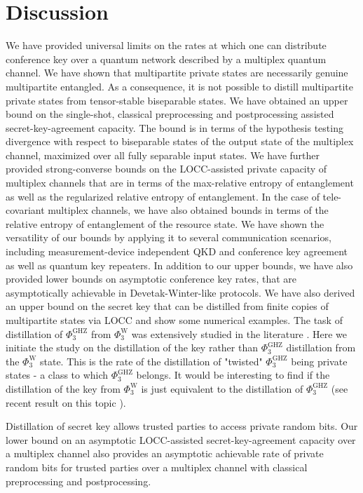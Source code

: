 \documentclass[aps,pra,twocolumn,superscriptaddress,longbibliography]{revtex4-1}
\begin{document}
\section{Discussion}
\label{sec:dis}
We have provided universal limits on the rates at which one can distribute conference key over a quantum network described by a multiplex quantum channel. We have shown that multipartite private states are necessarily genuine multipartite entangled. As a consequence, it is not possible to distill multipartite private states from tensor-stable biseparable states. We have obtained an upper bound on the single-shot, classical preprocessing and postprocessing assisted secret-key-agreement capacity. The bound is in terms of the hypothesis testing divergence with respect to biseparable states of the output state of the multiplex channel, maximized over all fully separable input states. We have further provided strong-converse bounds on the LOCC-assisted private capacity of multiplex channels that are in terms of the max-relative entropy of entanglement as well as the regularized relative entropy of entanglement. In the case of tele-covariant multiplex channels, we have also obtained bounds in terms of the relative entropy of entanglement of the resource state. We have shown the versatility of our bounds by applying it to several communication scenarios, including measurement-device independent QKD and conference key agreement as well as quantum key repeaters. In addition to our upper bounds, we have also provided lower bounds on asymptotic conference key rates, that are asymptotically achievable in Devetak-Winter-like protocols. We have also derived an upper bound on the secret key that can be distilled from finite copies of multipartite states via LOCC and show some numerical examples. The task of distillation of $\Phi_3^\mathrm{GHZ}$ from $\Phi_3^\mathrm{W}$ was extensively studied in the literature \cite{FL-2007,FL-2008,Hoi-Kwong2010}. Here we initiate the study on the distillation of the key rather than $\Phi_3^\mathrm{GHZ}$ distillation from the $\Phi_3^\mathrm{W}$ state. This is the rate of the distillation of "twisted" $\Phi_3^\mathrm{GHZ}$ being private states - a class to which $\Phi_3^\mathrm{GHZ}$ belongs. It would be interesting to find if the distillation of the key from $\Phi_3^\mathrm{W}$ is just equivalent to the distillation of $\Phi_3^\mathrm{GHZ}$ (see recent result on this topic \cite{Grasselli2019}).

Distillation of secret key allows trusted parties to access private random bits. Our lower bound on an asymptotic LOCC-assisted secret-key-agreement capacity over a multiplex channel also provides an asymptotic achievable rate of private random bits for trusted parties over a multiplex channel with classical preprocessing and postprocessing. 
\end{document}
